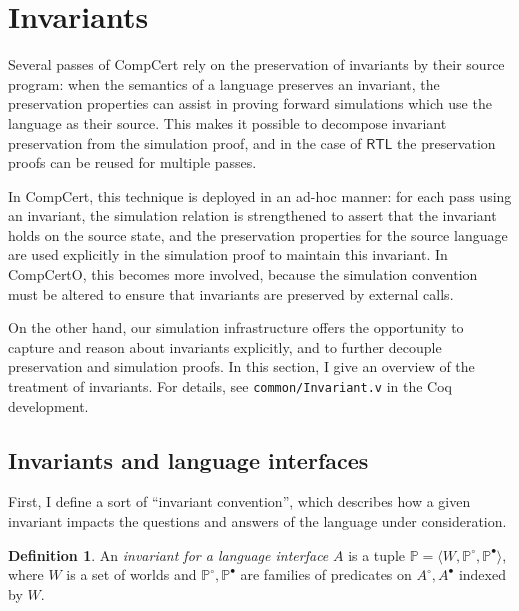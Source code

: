 \documentclass[11pt,oneside]{book}
\theoremstyle{definition}
\newtheorem{definition}[theorem]{Definition}
\newcommand{\kw}[1]{\ensuremath{ \mathsf{#1} }}
\newcommand{\que}{\circ}         %
\newcommand{\ans}{\bullet}       %
\begin{document}


\section{Invariants} \label{sec:inv} %


Several passes of CompCert
rely on the preservation of invariants
by their source program:
when the semantics of a language preserves an invariant,
the preservation properties can assist
in proving forward simulations
which use the language as their source.
This makes it possible to decompose
invariant preservation from the simulation proof,
and in the case of $\kw{RTL}$
the preservation proofs can be reused for multiple passes.

In CompCert,
this technique is deployed in an ad-hoc manner:
for each pass using an invariant,
the simulation relation is strengthened to assert that
the invariant holds on the source state,
and the preservation properties for the source language
are used explicitly in the simulation proof
to maintain this invariant.
In CompCertO,
this becomes more involved,
because the simulation convention must be altered
to ensure that invariants are preserved
by external calls.

On the other hand,
our simulation infrastructure offers the opportunity
to capture and reason about invariants explicitly,
and to further decouple preservation and simulation proofs.
In this section,
I give an overview of the treatment of invariants.
For details,
see
\texttt{common/Invariant.v}
in the Coq development.


\subsection{Invariants and language interfaces} %

First, I define a sort of ``invariant convention'',
which describes how a given invariant impacts the questions and answers
of the language under consideration.

\begin{definition} %
An \emph{invariant for a language interface} $A$
is a tuple
$\mathbb{P} = \langle W, \mathbb{P}^\que, \mathbb{P}^\ans \rangle$,
where $W$ is a set of worlds
and $\mathbb{P}^\que, \mathbb{P}^\ans$
are families of predicates on $A^\que, A^\ans$
indexed by $W$.
\end{definition}
\end{document}
